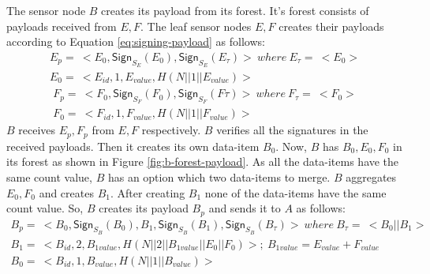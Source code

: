 		The sensor node $B$ creates its payload from its forest. 
		It's forest consists of payloads received from $E,F$.
		The leaf sensor nodes $E,F$ creates their payloads according to Equation \ref{eq:signing-payload} as follows:
		\begin{equation}
			\begin{array}{l}
			E_{p} =\ <E_{0}, \textsf{Sign}_{S_{E}}(E_{0}), \textsf{Sign}_{S_{E}}(E_{\tau}) >\ where\ E_{\tau} =\ <E_{0}>\\
			E_{0} =\ <E_{id}, 1, E_{value}, H(N||1||E_{value})>
			\end{array}
		\end{equation}
		\begin{equation}
			\begin{array}{l}
				F_{p} =\ <F_{0}, \textsf{Sign}_{S_{F}}(F_{0}), \textsf{Sign}_{S_{F}}(F{\tau}) >\ where\ F_{\tau} =\ <F_{0}>\\
				F_{0} =\ <F_{id}, 1, F_{value}, H(N||1||F_{value})>
			\end{array}
		\end{equation}
		$B$ receives $E_{p},F_{p}$ from $E,F$ respectively. 
		$B$ verifies all the signatures in the received payloads.
		Then it creates its own data-item $B_{0}$.
		Now, $B$ has $B_{0},E_{0},F_{0}$ in its forest as shown in Figure \ref{fig:b-forest-payload}. 
		As all the data-items have the same count value, $B$ has an option which two data-items to merge.
		$B$ aggregates $E_{0},F_{0}$ and creates $B_{1}$.
		After creating $B_{1}$ none of the data-items have the same count value. 
		So, $B$ creates its payload $B_{p}$ and sends it to $A$ as follows:
		\begin{equation}
			\begin{array}{l}
				B_{p} =\ < B_{0}, \textsf{Sign}_{S_{B}}(B_{0}), B_{1}, \textsf{Sign}_{S_{B}}(B_{1}), \textsf{Sign}_{S_{B}}(B_{\tau}) >\ where\ B_{\tau} =\ <B_{0} || B_{1}>\\
				B_{1} =\ < B_{id}, 2, B_{1value}, H(N||2||B_{1value}||E_{0}||F_{0})>;\ B_{1value} = E_{value} + F_{value} \\
				B_{0} =\ <B_{id}, 1, B_{value}, H(N||1||B_{value})>
			\end{array}
			\label{eq:b-payload}
		\end{equation}
